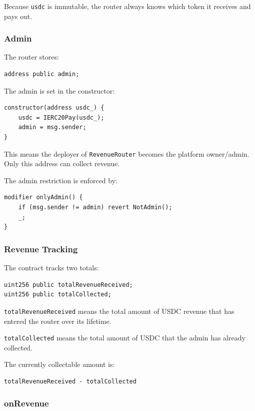 \documentclass[11pt,a4paper]{article}
\begin{document}
Because \texttt{usdc} is immutable, the router always knows which token it receives and pays out.

\subsubsection{Admin}

The router stores:

\begin{lstlisting}
address public admin;
\end{lstlisting}

The admin is set in the constructor:

\begin{lstlisting}
constructor(address usdc_) {
    usdc = IERC20Pay(usdc_);
    admin = msg.sender;
}
\end{lstlisting}

This means the deployer of \texttt{RevenueRouter} becomes the platform owner/admin. Only this address can collect revenue.

The admin restriction is enforced by:

\begin{lstlisting}
modifier onlyAdmin() {
    if (msg.sender != admin) revert NotAdmin();
    _;
}
\end{lstlisting}

\subsubsection{Revenue Tracking}

The contract tracks two totals:

\begin{lstlisting}
uint256 public totalRevenueReceived;
uint256 public totalCollected;
\end{lstlisting}

\texttt{totalRevenueReceived} means the total amount of USDC revenue that has entered the router over its lifetime.

\texttt{totalCollected} means the total amount of USDC that the admin has already collected.

The currently collectable amount is:

\begin{lstlisting}
totalRevenueReceived - totalCollected
\end{lstlisting}

\subsubsection{onRevenue}
\end{document}
